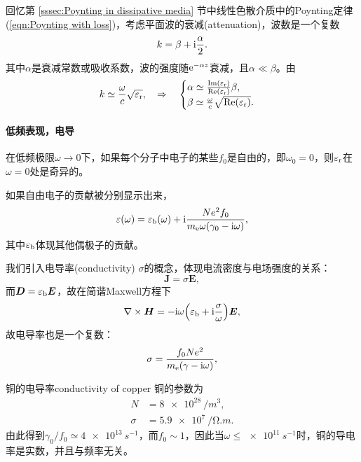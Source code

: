 回忆第 \ref{sssec:Poynting in dissipative media} 节中线性色散介质中的Poynting定律(\ref{eqn:Poynting with loss})，考虑平面波的衰减(attenuation)，波数是一个复数
\[
    k=\beta+\mathrm{i}\frac\alpha 2.
\]
其中$\alpha$是衰减常数或吸收系数，波的强度随$\mathop{}\!\mathrm{e}^{-\alpha z}$衰减，且$\alpha\ll\beta$。由
\[
    k\simeq\frac\omega c\sqrt{\varepsilon_\text r},\quad\Rightarrow\quad
    \begin{cases}
        \alpha\simeq\frac{\operatorname{Im}(\varepsilon_\text r)}{\operatorname{Re}(\varepsilon_\text r)}\beta,\\
        \beta\simeq\frac\omega c\sqrt{\operatorname{Re}(\varepsilon_\text r)}.
    \end{cases}
\]
\paragraph{低频表现，电导}
在低频极限$\omega\to0$下，如果每个分子中电子的某些$f_0$是自由的，即$\omega_0=0$，则$\varepsilon_\text r$在$\omega=0$处是奇异的。

如果自由电子的贡献被分别显示出来，
\[
    \varepsilon(\omega)=\varepsilon_\text b(\omega)+\mathrm{i}\frac{Ne^2f_0}{m_\mathrm e\omega(\gamma_0-\mathrm{i}\omega)},
\]
其中$\varepsilon_\text b$体现其他偶极子的贡献。

我们引入电导率(conductivity) $\sigma$的概念，体现电流密度与电场强度的关系：
\[
    \bm J=\sigma\bm E,
\]
而$\bm D=\varepsilon_\text b\bm E$，故在简谐Maxwell方程下
\[
    \nabla\times\bm H=-\mathrm{i}\omega\Bigl(\varepsilon_\text b+\mathrm{i}\frac\sigma\omega\Bigr)\bm E,
\]
故电导率也是一个复数：
\begin{equation}
    \sigma=\frac{f_0Ne^2}{m_\mathrm e(\gamma-\mathrm{i}\omega)},
\end{equation} 
\begin{example}{铜的电导率}{conductivity of copper}
    铜的参数为
    \begin{align*}
        N&=\SI{8e28}{/m^3},\\
        \sigma&=\SI{5.9e7}{/\ohm.m}.
    \end{align*}
    由此得到$\gamma_0/f_0\simeq\SI{4e13}{s^{-1}}$，而$f_0\sim 1$，因此当$\omega\leqslant\SI{e11}{s^{-1}}$时，铜的导电率是实数，并且与频率无关。
\end{example}
